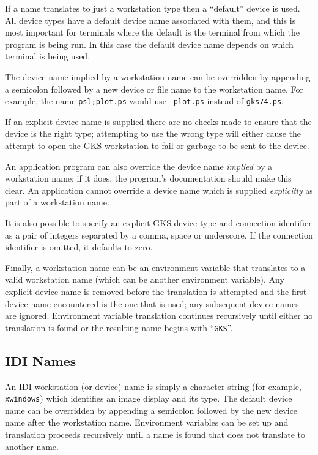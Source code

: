 \documentclass[twoside,11pt]{article}
\newcommand{\xlabel}[1]{}
\renewcommand{\_}{\texttt{\symbol{95}}}
\begin{document}
If a name translates to just a workstation type then a  ``default'' device
is used. All device types have a default device name associated with them,
and this is most important for terminals where the default is the terminal
from which the program is being run. In this case the default device name
depends on which terminal is being used.

The device name implied by a workstation name can be overridden by
appending a semicolon followed by a new device or file name to the
workstation name. For example, the name {\tt ps\_l;plot.ps} would use {\tt
plot.ps} instead of {\tt gks74.ps}.

If an explicit device name is supplied there are no checks made to ensure
that the device is the right type; attempting to use the wrong type will
either cause the attempt to open the GKS workstation to fail or garbage to
be sent to the device.

An application program can also override the device name {\em implied\/} by a
workstation name; if it does, the program's documentation should make this
clear. An application cannot override a device name which is supplied
{\em explicitly\/} as part of a workstation name.

It is also possible to specify an explicit GKS device type and connection
identifier as a pair of integers separated by a comma, space or underscore. If
the connection identifier is omitted, it defaults to zero.

Finally, a workstation name can be an environment
variable that translates to a valid workstation name (which can be another
environment variable). Any explicit device
name is removed before the translation is attempted and the first device name
encountered is the one that is used; any subsequent device names are ignored.
Environment variable translation continues recursively until either no
translation is found or the resulting name begins with ``{\tt{GKS\_}}''.

\subsection{\xlabel{IDIWorkstationNames}IDI Names}

An IDI workstation (or device) name is simply a character string (for example,
{\tt xwindows}) which identifies an image display and its type. The default
device name can be overridden by appending a semicolon followed by the new
device name after the workstation name.
Environment variables can be set up and
translation proceeds recursively until a name is found that does not
translate to another name.
\end{document}
